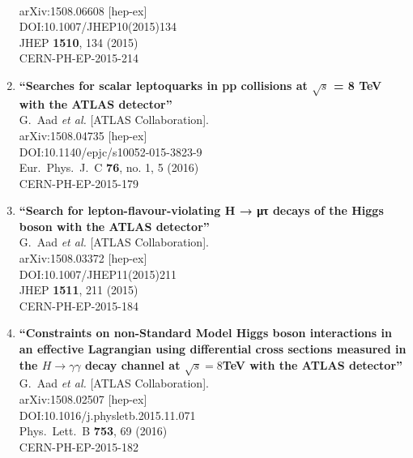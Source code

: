 \documentclass{article}
\begin{document}
\begin{enumerate}
  \\{}arXiv:1508.06608 [hep-ex]
  \\{}DOI:10.1007/JHEP10(2015)134
  \\{}JHEP {\bf 1510}, 134 (2015)
  \\{}CERN-PH-EP-2015-214
\item%
{\bf ``Searches for scalar leptoquarks in pp collisions at ${\sqrt{s}}$ = 8 TeV with the ATLAS detector''}
  \\{}G.~Aad {\it et al.} [ATLAS Collaboration].
  \\{}arXiv:1508.04735 [hep-ex]
  \\{}DOI:10.1140/epjc/s10052-015-3823-9
  \\{}Eur.\ Phys.\ J.\ C {\bf 76}, no. 1, 5 (2016)
  \\{}CERN-PH-EP-2015-179
\item%
{\bf ``Search for lepton-flavour-violating H → μτ decays of the Higgs boson with the ATLAS detector''}
  \\{}G.~Aad {\it et al.} [ATLAS Collaboration].
  \\{}arXiv:1508.03372 [hep-ex]
  \\{}DOI:10.1007/JHEP11(2015)211
  \\{}JHEP {\bf 1511}, 211 (2015)
  \\{}CERN-PH-EP-2015-184
\item%
{\bf ``Constraints on non-Standard Model Higgs boson interactions in an effective Lagrangian using differential cross sections measured in the $H \rightarrow \gamma\gamma$ decay channel at $\sqrt{s} = 8$TeV with the ATLAS detector''}
  \\{}G.~Aad {\it et al.} [ATLAS Collaboration].
  \\{}arXiv:1508.02507 [hep-ex]
  \\{}DOI:10.1016/j.physletb.2015.11.071
  \\{}Phys.\ Lett.\ B {\bf 753}, 69 (2016)
  \\{}CERN-PH-EP-2015-182

\end{enumerate}
\end{document}
